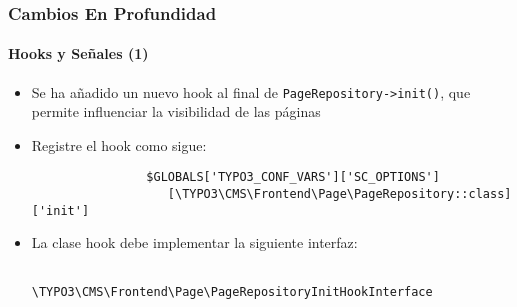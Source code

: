 
\begin{frame}[fragile]
	\frametitle{Cambios En Profundidad}
	\framesubtitle{Hooks y Señales (1)}

	\begin{itemize}

		\item Se ha añadido un nuevo hook al final de \texttt{PageRepository->init()},
			que permite influenciar la visibilidad de las páginas

		\item Registre el hook como sigue:
			\begin{lstlisting}
				$GLOBALS['TYPO3_CONF_VARS']['SC_OPTIONS']
				   [\TYPO3\CMS\Frontend\Page\PageRepository::class]['init']
			\end{lstlisting}

		\item La clase hook debe implementar la siguiente interfaz:
			\begin{lstlisting}
				\TYPO3\CMS\Frontend\Page\PageRepositoryInitHookInterface
			\end{lstlisting}

	\end{itemize}

\end{frame}


